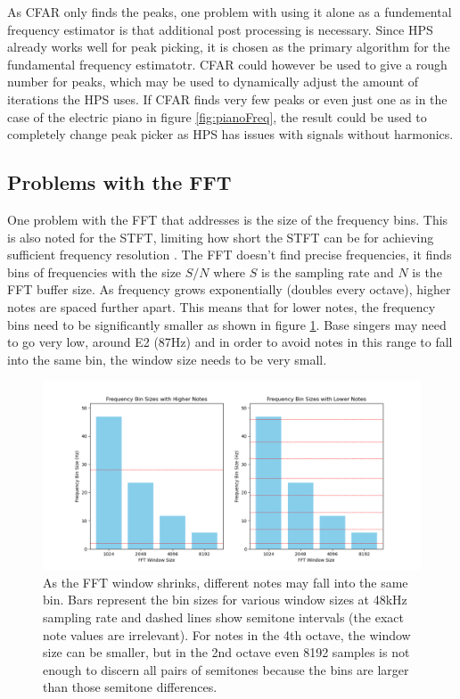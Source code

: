 As CFAR only finds the peaks, one problem with using it alone as a fundemental frequency estimator is that additional post processing is necessary. Since HPS already works well for peak picking, it is chosen as the primary algorithm for the fundamental frequency estimatotr. CFAR could however be used to give a rough number for peaks, which may be used to dynamically adjust the amount of iterations the HPS uses. If CFAR finds very few peaks or even just one as in the case of the electric piano in figure \ref{fig:pianoFreq}, the result could be used to completely change peak picker as HPS has issues with signals without harmonics.

\subsection{Problems with the FFT}
One problem with the FFT that \cite{Gotsopoulos} addresses is the size of the frequency bins. This is also noted for the STFT, limiting how short the STFT can be for achieving sufficient frequency resolution \cite{Evans2012}. The FFT doesn't find precise frequencies, it finds bins of frequencies with the size $S/N$ where $S$ is the sampling rate and $N$ is the FFT buffer size. As frequency grows exponentially (doubles every octave), higher notes are spaced further apart. This means that for lower notes, the frequency bins need to be significantly smaller as shown in figure \ref{fig:fftBinSizeChart}. Base singers may need to go very low, around E2 (87Hz) and in order to avoid notes in this range to fall into the same bin, the window size needs to be very small.  

\begin{figure}[ht]
    \centering
    \includegraphics[width=\textwidth]{./images/fft_bin_size_chart.png}
    \caption{As the FFT window shrinks, different notes may fall into the same bin. Bars represent the bin sizes for various window sizes at 48kHz sampling rate and dashed lines show semitone intervals (the exact note values are irrelevant). For notes in the 4th octave, the window size can be smaller, but in the 2nd octave even 8192 samples is not enough to discern all pairs of semitones because the bins are larger than those semitone differences.\label{fig:fftBinSizeChart}}
\end{figure}

